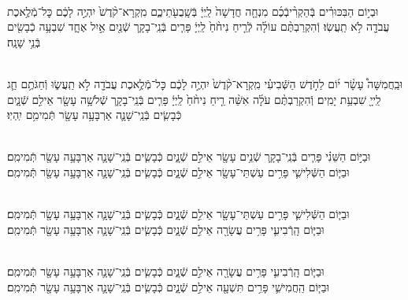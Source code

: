 \documentclass[twoside, openany, parskip=half, 11pt]{book}
\begin{document}
\\
וּבְי֣וֹם הַבִּכּוּרִ֗ים בְּֿהַקְרִ֨יבְֿכֶ֜ם מִנְחָ֤ה חֲדָשָׁה֙ לַֽיְיָ֔ בְּֿשָֽׁבֻעֹ֖תֵיכֶ֑ם מִֽקְרָא־קֹ֨דֶשׁ֙ יִהְיֶ֣ה לָכֶ֔ם כׇּל־מְֿלֶ֥אכֶת עֲבֹדָ֖ה לֹ֥א תַֽעֲשֽׂוּ׃ וְֿהִקְרַבְתֶּ֨ם עוֹלָ֜ה לְֿרֵ֤יחַ נִיחֹ֨חַ֙ לַֽיְיָ֔ פָּרִ֧ים בְּֿנֵֽי־בָקָ֛ר שְֿׁנַ֖יִם אַ֣יִל אֶחָ֑ד שִׁבְעָ֥ה כְֿבָשִׂ֖ים בְּֿנֵ֥י שָׁנָֽה׃


\\
וּבַֽחֲמִשָּׁה֩ עָשָׂ֨ר י֜וֹם לַחֹ֣דֶשׁ הַשְּֿׁבִיעִ֗י מִֽקְרָא־קֹ֨דֶשׁ֙ יִהְיֶ֣ה לָכֶ֔ם כׇּל־מְֿלֶ֥אכֶת עֲבֹדָ֖ה לֹ֣א תַֽעֲשׂ֑וּ וְֿחַגֹּתֶ֥ם חַ֛ג לַֽייָ֖ שִׁבְעַ֥ת יָמִֽים׃ וְֿהִקְרַבְתֶּ֨ם עֹלָ֜ה אִשֵּׁ֨ה רֵ֤יחַ נִיחֹ֨חַ֙ לַֽיְיָ֔ פָּרִ֧ים בְּֿנֵֽי־בָקָ֛ר שְֿׁלֹשָׁ֥ה עָשָׂ֖ר אֵילִ֣ם שְֿׁנָ֑יִם כְּֿבָשִׂ֧ים בְּֿנֵֽי־שָׁנָ֛ה אַרְבָּעָ֥ה עָשָׂ֖ר תְּֿמִימִ֥ם יִֽהְיֽוּ׃



\\
וּבַיּ֣וֹם הַשֵּׁנִ֗י פָּרִ֧ים בְּֿנֵֽי־בָקָ֛ר שְֿׁנֵ֥ים עָשָׂ֖ר אֵילִ֣ם שְֿׁנָ֑יִם כְּֿבָשִׂ֧ים בְּֿנֵֽי־שָׁנָ֛ה אַרְבָּעָ֥ה עָשָׂ֖ר תְּֿמִימִֽם׃
\\
וּבַיּ֧וֹם הַשְּֿׁלִישִׁ֛י פָּרִ֥ים עַשְׁתֵּי־עָשָׂ֖ר אֵילִ֣ם שְֿׁנָ֑יִם כְּֿבָשִׂ֧ים בְּֿנֵֽי־שָׁנָ֛ה אַרְבָּעָ֥ה עָשָׂ֖ר תְּֿמִימִֽם׃



\\
וּבַיּ֧וֹם הַשְּֿׁלִישִׁ֛י פָּרִ֥ים עַשְׁתֵּי־עָשָׂ֖ר אֵילִ֣ם שְֿׁנָ֑יִם כְּֿבָשִׂ֧ים בְּֿנֵֽי־שָׁנָ֛ה אַרְבָּעָ֥ה עָשָׂ֖ר תְּֿמִימִֽם׃
\\
וּבַיּ֧וֹם הָֽרְֿבִיעִ֛י פָּרִ֥ים עֲשָׂרָ֖ה אֵילִ֣ם שְֿׁנָ֑יִם כְּֿבָשִׂ֧ים בְּֿנֵֽי־שָׁנָ֛ה אַרְבָּעָ֥ה עָשָׂ֖ר תְּֿמִימִֽם׃



\\
וּבַיּ֧וֹם הָֽרְֿבִיעִ֛י פָּרִ֥ים עֲשָׂרָ֖ה אֵילִ֣ם שְֿׁנָ֑יִם כְּֿבָשִׂ֧ים בְּֿנֵֽי־שָׁנָ֛ה אַרְבָּעָ֥ה עָשָׂ֖ר תְּֿמִימִֽם׃
\\
וּבַיּ֧וֹם הַֽחֲמִישִׁ֛י פָּרִ֥ים תִּשְׁעָ֖ה אֵילִ֣ם שְֿׁנָ֑יִם כְּֿבָשִׂ֧ים בְּֿנֵֽי־שָׁנָ֛ה אַרְבָּעָ֥ה עָשָׂ֖ר תְּֿמִימִֽם׃
\end{document}
